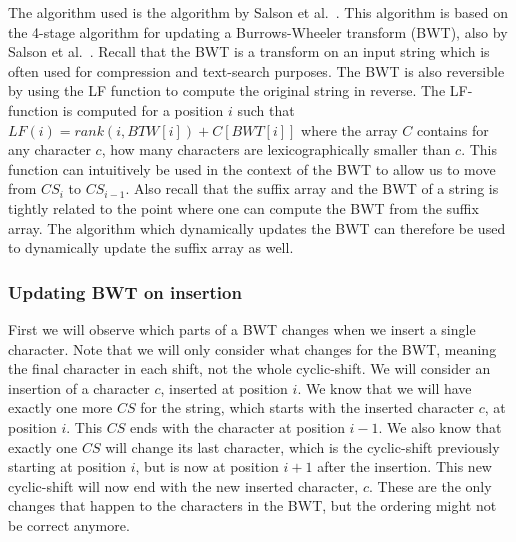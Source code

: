 The algorithm used is the algorithm by Salson et al.~\cite{DynamicExtendedSuffixArrays}.
This algorithm is based on the 4-stage algorithm for updating a Burrows-Wheeler transform
(BWT), also by Salson et al.~\cite{DynamicBWT}. Recall that the BWT is a transform on an
input string which is often used for compression and text-search purposes. The BWT is also
reversible by using the LF function to compute the original string in reverse. The
LF-function is computed for a position $i$ such that $LF(i) = rank(i, BTW[i]) + C[BWT[i]]$
where the array $C$ contains for any character $c$, how many characters are
lexicographically smaller than $c$. This function can intuitively be used in the context
of the BWT to allow us to move from $CS_i$ to $CS_{i-1}$. Also recall that the suffix
array and the BWT of a string is tightly related to the point where one can compute the
BWT from the suffix array. The algorithm which dynamically updates the BWT can therefore
be used to dynamically update the suffix array as well.

\subsubsection{Updating BWT on insertion}

First we will observe which parts of a BWT changes when we insert a single character. Note
that we will only consider what changes for the BWT, meaning the final character in each
shift, not the whole cyclic-shift. We will consider an insertion of a character $c$,
inserted at position $i$. We know that we will have exactly one more $CS$ for the string,
which starts with the inserted character $c$, at position $i$. This $CS$ ends with the
character at position $i - 1$. We also know that exactly one $CS$ will change its last
character, which is the cyclic-shift previously starting at position $i$, but is now at
position $i + 1$ after the insertion. This new cyclic-shift will now end with the new
inserted character, $c$. These are the only changes that happen to the characters in the
BWT, but the ordering might not be correct anymore.

